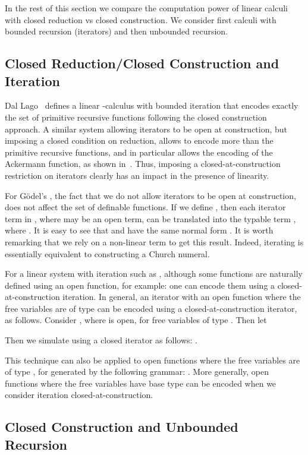 \documentclass{article}
\begin{document}
In the rest of this section we compare the computation power of linear calculi
with closed reduction vs closed construction. We consider first calculi
 with bounded recursion (iterators) and then unbounded recursion.

\subsection{Closed Reduction/Closed Construction and Iteration}
Dal Lago~\cite{Lago05} defines a linear -calculus with
bounded iteration that encodes exactly the set of primitive recursive
functions following the closed construction approach. 
A similar system allowing iterators to be open at
construction, but imposing a closed condition on reduction, allows to
encode more than the primitive recursive functions, and in particular
allows the encoding of the Ackermann function, as shown
in~\cite{AlvesFFM07}.
Thus, imposing a closed-at-construction restriction on iterators clearly has
an impact in the presence of linearity. 


For G\"odel's \ST, the fact that we do not allow iterators to be open
at construction, does not affect the set of definable functions.  If
we define , then each iterator term
 in \ST, where  may be an open term, can be
translated into the typable term ,
where . It is easy to see that  and
 have the same normal form . It is worth remarking that we rely on a non-linear term  to
get this result. Indeed, iterating  is essentially equivalent to
constructing a Church numeral.

For a linear system with iteration such as \LLCI, although some
functions are naturally defined using an open function, for example:
 one
can encode them using a closed-at-construction iteration.  In general,
an iterator with an open function where the free variables are of type
 can be encoded using a closed-at-construction iterator, as
follows.  Consider , where  is open, for free
variables  of type . Then let 

Then we simulate
 using a closed iterator as follows:
.

This technique can also be applied to open functions where the free
variables are of type , for  generated by the following
grammar: .  More generally, open
functions where the free variables have base type can be encoded when
we consider iteration closed-at-construction.


\subsection{Closed Construction and Unbounded Recursion}
\end{document}
